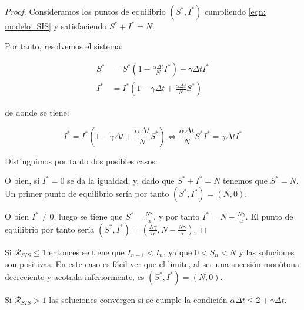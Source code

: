 \begin{proof}
Consideramos los puntos de equilibrio $(S^*, I^*)$ cumpliendo \eqref{eqn: modelo_SIS} y satisfaciendo $S^*+I^*=N$.

Por tanto, resolvemos el sistema:

\begin{equation}
\begin{aligned}
S^* & = S^* \left(1-\frac{\alpha\Delta t}{N} I^* \right) + \gamma \Delta t I^* \\
I^* & = I^* \left( 1-\gamma \Delta t + \frac{\alpha\Delta t}{N} S^* \right)
\end{aligned}
\end{equation}

de donde se tiene:

$$I^* = I^* \left( 1-\gamma \Delta t + \frac{\alpha\Delta t}{N} S^* \right) \Leftrightarrow \frac{\alpha\Delta t}{N} S^*I^* = \gamma\Delta t I^*$$

Distinguimos por tanto dos posibles casos:

O bien, si $I^*=0$ se da la igualdad, y, dado que $S^*+I^*=N$ tenemos que $S^*=N$. Un primer punto de equilibrio sería por tanto $(S^*,I^*)=(N,0)$.

O bien $I^*\neq 0$, luego se tiene que $S^*=\frac{N\gamma}{\alpha}$, y por tanto $I^*=N-\frac{N\gamma}{\alpha}$. El punto de equilibrio por tanto sería $(S^*,I^*)=(\frac{N\gamma}{\alpha}, N-\frac{N\gamma}{\alpha})$.


\end{proof}


\begin{lemma}
Si $\mathcal{R}_{SIS}\leq 1$ entonces se tiene que $I_{n+1} < I_n$, ya que $0<S_n<N$ y las soluciones son positivas. En este caso es fácil ver que el límite, al ser una sucesión monótona decreciente y acotada inferiormente, es $(S^*,I^*)=(N,0)$.

Si $\mathcal{R}_{SIS}>1$ las soluciones convergen si se cumple la condición $\alpha \Delta t \leq 2+\gamma \Delta t$.
\end{lemma}

